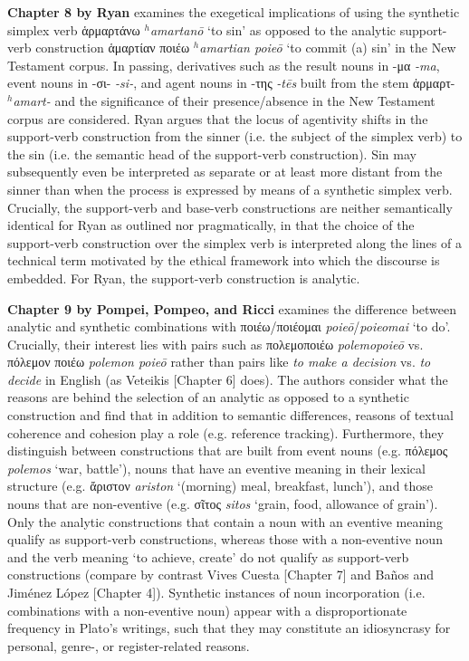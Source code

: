\documentclass[output=paper,colorlinks,citecolor=brown]{langscibook}
\begin{document}
\textbf{Chapter 8 by Ryan} examines the exegetical implications of using the synthetic simplex verb ἁρμαρτάνω \textit{$^h$amartanō} ‘to sin’ as opposed to the analytic support-verb construction ἁμαρτίαν ποιέω \textit{$^h$amartian poieō} ‘to commit (a) sin’ in the New Testament corpus. In passing, derivatives such as the result nouns in -μα \textit{-ma}, event nouns in -σι- \textit{-si-}, and agent nouns in -της \textit{-tēs} built from the stem ἁρμαρτ- \textit{$^h$amart-} and the significance of their presence/absence in the New Testament corpus are considered. Ryan argues that the locus of agentivity shifts in the support-verb construction from the sinner (i.e. the subject of the simplex verb) to the sin (i.e. the semantic head of the support-verb construction). Sin may subsequently even be interpreted as separate or at least more distant from the sinner than when the process is expressed by means of a synthetic simplex verb. Crucially, the support-verb and base-verb constructions are neither semantically identical for Ryan as outlined nor pragmatically, in that the choice of the support-verb construction over the simplex verb is interpreted along the lines of a technical term motivated by the ethical framework into which the discourse is embedded. For Ryan, the support-verb construction is analytic. 

\textbf{Chapter 9 by Pompei, Pompeo, and Ricci} examines the difference between analytic and synthetic combinations with ποιέω/ποιέομαι \textit{poieō}/\textit{poieomai} ‘to do’. Crucially, their interest lies with pairs such as πολεμοποιέω \textit{polemopoieō} vs. πόλεμον ποιέω \textit{polemon poieō} rather than pairs like \textit{to make a decision} vs. \textit{to decide} in English (as Veteikis [Chapter 6] does). The authors consider what the reasons are behind the selection of an analytic as opposed to a synthetic construction and find that in addition to semantic differences, reasons of textual coherence and cohesion play a role (e.g. reference tracking). Furthermore, they distinguish between constructions that are built from event nouns (e.g. πόλεμος \textit{polemos} ‘war, battle’), nouns that have an eventive meaning in their lexical structure (e.g. ἄριστον \textit{ariston} ‘(morning) meal, breakfast, lunch’), and those nouns that are non-eventive (e.g. σῖτος \textit{sitos} ‘grain, food, allowance of grain’). Only the analytic constructions that contain a noun with an eventive meaning qualify as support-verb constructions, whereas those with a non-eventive noun and the verb meaning ‘to achieve, create’ do not qualify as support-verb constructions (compare by contrast Vives Cuesta [Chapter 7] and Baños and Jiménez López [Chapter 4]). Synthetic instances of noun incorporation (i.e. combinations with a non-eventive noun) appear with a disproportionate frequency in Plato’s writings, such that they may constitute an idiosyncrasy for personal, genre-, or register-related reasons.
\end{document}
